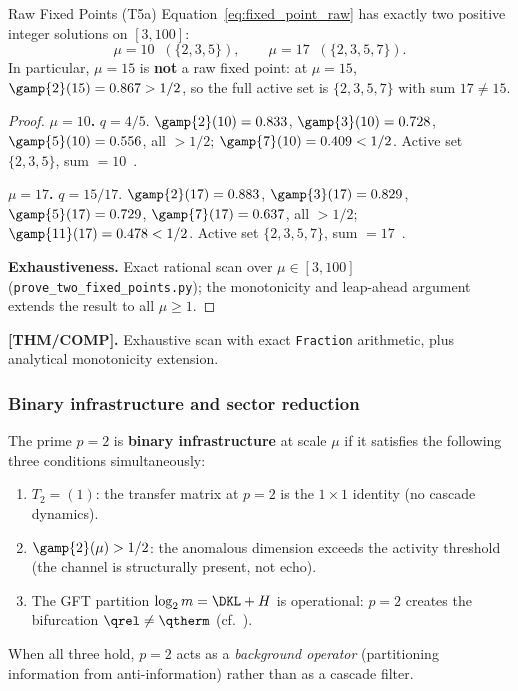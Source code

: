 \documentclass[12pt,a4paper]{article}
\begin{document}
\begin{thmbox}{Raw Fixed Points (T5a)}
\label{thm:T5a}
Equation~\eqref{eq:fixed_point_raw} has exactly two positive integer
solutions on $[3, 100]$:
\begin{equation}
  \mu = 10 \;\;(\{2,3,5\}), \qquad \mu = 17 \;\;(\{2,3,5,7\}).
  \label{eq:raw_fps}
\end{equation}
In particular, $\mu = 15$ is \textbf{not} a raw fixed point: at
$\mu = 15$, $\gamp{2}(15) = 0.867 > 1/2$, so the full active set is
$\{2,3,5,7\}$ with sum $17 \neq 15$.

\begin{proof}
\textbf{$\mu = 10$.}
$q = 4/5$.  $\gamp{2}(10) = 0.833$, $\gamp{3}(10) = 0.728$,
$\gamp{5}(10) = 0.556$, all $> 1/2$; $\gamp{7}(10) = 0.409 < 1/2$.
Active set $\{2,3,5\}$, sum $= 10$~\checkmark.

\textbf{$\mu = 17$.}
$q = 15/17$.  $\gamp{2}(17) = 0.883$, $\gamp{3}(17) = 0.829$,
$\gamp{5}(17) = 0.729$, $\gamp{7}(17) = 0.637$, all $> 1/2$;
$\gamp{11}(17) = 0.478 < 1/2$.
Active set $\{2,3,5,7\}$, sum $= 17$~\checkmark.

\textbf{Exhaustiveness.}
Exact rational scan over $\mu \in [3, 100]$
(\texttt{prove\_two\_fixed\_points.py}); the monotonicity
and leap-ahead argument extends the result to all $\mu \geq 1$.
\end{proof}

\medskip\noindent\textbf{[THM/COMP].}\;
Exhaustive scan with exact \texttt{Fraction} arithmetic, plus
analytical monotonicity extension.
\end{thmbox}

\subsubsection{Binary infrastructure and sector reduction}
\label{sec:ch8_reduction}

\begin{definition}
\label{def:binary_infrastructure}
The prime $p = 2$ is \textbf{binary infrastructure} at scale $\mu$ if
it satisfies the following three conditions simultaneously:
\begin{enumerate}[nosep, label=(I\arabic*)]
\item \label{it:I1}
  $T_2 = (1)$: the transfer matrix at $p = 2$ is the $1 \times 1$
  identity (no cascade dynamics).
\item \label{it:I2}
  $\gamp{2}(\mu) > 1/2$: the anomalous dimension exceeds the
  activity threshold (the channel is structurally present, not echo).
\item \label{it:I3}
  The GFT partition $\log_2 m = \DKL + H$ is operational:
  $p = 2$ creates the bifurcation $\qrel \neq \qtherm$
  (cf.~\cite{companion_M1}).
\end{enumerate}
When all three hold, $p = 2$ acts as a \emph{background operator}
(partitioning information from anti-information) rather than as a
cascade filter.
\end{definition}
\end{document}
